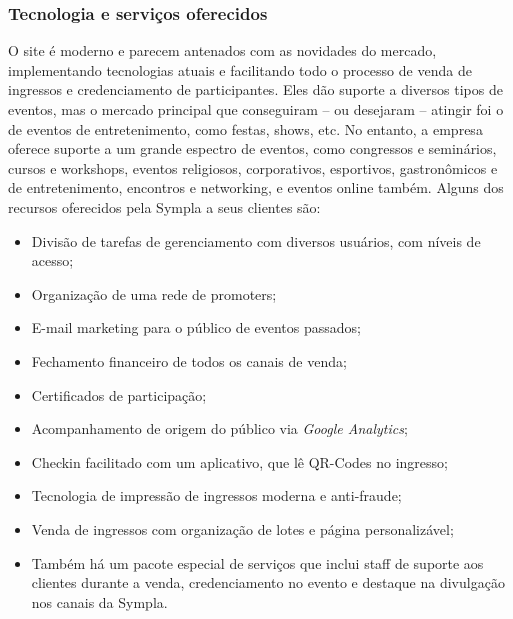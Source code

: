 \documentclass[12pt,a4paper,twoside,hyphens,english,brazil]{abntex2}
\begin{document}
\subsubsection*{Tecnologia e serviços oferecidos}
O site é moderno e parecem antenados com as novidades do mercado, implementando tecnologias atuais e facilitando todo o processo de venda de ingressos e credenciamento de participantes. Eles dão suporte a diversos tipos de eventos, mas o mercado principal que conseguiram -- ou desejaram -- atingir foi o de eventos de entretenimento, como festas, shows, etc. No entanto, a empresa oferece suporte a um grande espectro de eventos, como congressos e seminários, cursos e workshops, eventos religiosos, corporativos, esportivos, gastronômicos e de entretenimento, encontros e networking, e eventos online também. Alguns dos recursos oferecidos pela Sympla a seus clientes são\cite{sympla-features}:
\begin{itemize}[itemsep=-1ex]
	\item Divisão de tarefas de gerenciamento com diversos usuários, com níveis de acesso;
	\item Organização de uma rede de promoters;
	\item E-mail marketing para o público de eventos passados;
	\item Fechamento financeiro de todos os canais de venda;
	\item Certificados de participação;
	\item Acompanhamento de origem do público via \emph{Google Analytics};
	\item Checkin facilitado com um aplicativo, que lê QR-Codes no ingresso;
	\item Tecnologia de impressão de ingressos moderna e anti-fraude;
	\item Venda de ingressos com organização de lotes e página personalizável;
	\item Também há um pacote especial de serviços que inclui staff de suporte aos clientes durante a venda, credenciamento no evento e destaque na divulgação nos canais da Sympla.
\end{itemize}
\end{document}
